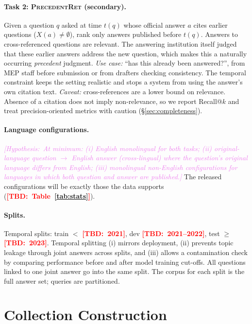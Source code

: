 \documentclass[runningheads]{llncs}
\newcommand{\TBD}[1]{\textcolor{red}{\textbf{[TBD:~#1]}}}
\newcommand{\HYP}[1]{\textcolor{violet}{\textit{[Hypothesis:~#1]}}}
\newcommand{\TBD}[1]{\errmessage{Unresolved TBD: #1}}
\newcommand{\HYP}[1]{#1}
\newcommand{\taskP}{\textsc{PrecedentRet}}
\begin{document}
\paragraph{Task 2: \taskP{} (secondary).}
Given a question $q$ asked at time $t(q)$ whose official answer $a$ cites earlier
questions ($X(a)\neq\emptyset$), rank only answers published before $t(q)$.
Answers to cross-referenced questions are relevant. The answering institution
itself judged that these earlier answers address the new question, which
makes this a naturally occurring \emph{precedent} judgment.
\emph{Use case:} ``has this already been answered?'', from MEP staff before
submission or from drafters checking consistency. The temporal constraint
keeps the setting realistic and stops a system from using the answer's own
citation text.
\emph{Caveat:} cross-references are a lower bound on relevance. Absence of
a citation does not imply non-relevance, so we report Recall@$k$ and
treat precision-oriented metrics with caution (\S\ref{sec:completeness}).

\paragraph{Language configurations.}
\HYP{At minimum: (i) English monolingual for both tasks; (ii) original-language
question $\to$ English answer (cross-lingual) where the question's original
language differs from English; (iii) monolingual non-English configurations
for languages in which both question and answer are published.} The released
configurations will be exactly those the data supports (\TBD{Table~\ref{tab:stats}}).

\paragraph{Splits.}
Temporal splits: train $<$ \TBD{2021}, dev \TBD{2021--2022}, test $\geq$
\TBD{2023}. Temporal splitting (i) mirrors deployment, (ii) prevents topic
leakage through joint answers across splits, and (iii) allows a
contamination check by comparing performance before and after model
training cut-offs. All questions linked to one joint answer go into the same
split. The corpus for each split is the full answer set; queries are
partitioned.

\section{Collection Construction}\label{sec:construction}
\end{document}
